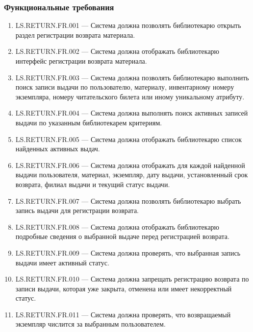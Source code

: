 \documentclass[12pt,a4paper]{article}
\begin{document}
	\subsubsection{Функциональные требования}
	
	\begin{enumerate}
		\item LS.RETURN.FR.001 --- Система должна позволять библиотекарю открыть
		раздел регистрации возврата материала.
		
		\item LS.RETURN.FR.002 --- Система должна отображать библиотекарю интерфейс
		регистрации возврата материала.
		
		\item LS.RETURN.FR.003 --- Система должна позволять библиотекарю выполнить
		поиск записи выдачи по пользователю, материалу, инвентарному номеру
		экземпляра, номеру читательского билета или иному уникальному атрибуту.
		
		\item LS.RETURN.FR.004 --- Система должна выполнять поиск активных записей
		выдачи по указанным библиотекарем критериям.
		
		\item LS.RETURN.FR.005 --- Система должна отображать библиотекарю список
		найденных активных выдач.
		
		\item LS.RETURN.FR.006 --- Система должна отображать для каждой найденной
		выдачи пользователя, материал, экземпляр, дату выдачи, установленный срок
		возврата, филиал выдачи и текущий статус выдачи.
		
		\item LS.RETURN.FR.007 --- Система должна позволять библиотекарю выбрать
		запись выдачи для регистрации возврата.
		
		\item LS.RETURN.FR.008 --- Система должна отображать библиотекарю подробные
		сведения о выбранной выдаче перед регистрацией возврата.
		
		\item LS.RETURN.FR.009 --- Система должна проверять, что выбранная запись
		выдачи имеет активный статус.
		
		\item LS.RETURN.FR.010 --- Система должна запрещать регистрацию возврата
		по записи выдачи, которая уже закрыта, отменена или имеет некорректный
		статус.
		
		\item LS.RETURN.FR.011 --- Система должна проверять, что возвращаемый экземпляр
		числится за выбранным пользователем.
		

\end{enumerate}
\end{document}
